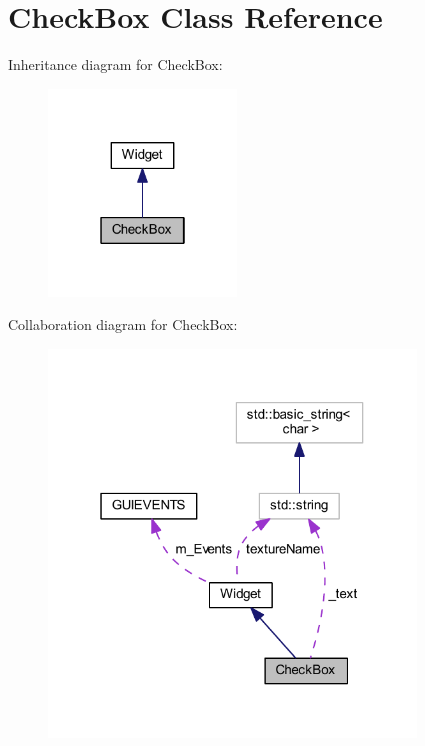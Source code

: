 \hypertarget{class_check_box}{}\section{Check\+Box Class Reference}
\label{class_check_box}


Inheritance diagram for Check\+Box\+:
\nopagebreak
\begin{figure}[H]
\begin{center}
\leavevmode
\includegraphics[width=142pt]{class_check_box__inherit__graph}
\end{center}
\end{figure}


Collaboration diagram for Check\+Box\+:
\nopagebreak
\begin{figure}[H]
\begin{center}
\leavevmode
\includegraphics[width=277pt]{class_check_box__coll__graph}
\end{center}
\end{figure}
